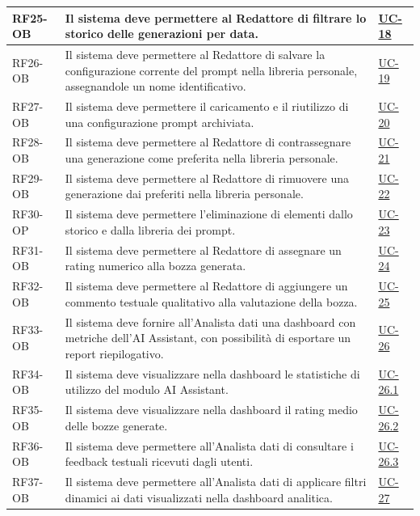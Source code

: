 ﻿\documentclass[a4paper,12pt]{article}
\begin{document}
\begin{description}[style=multiline, leftmargin=4cm, font=\bfseries]
\begin{enumerate}[leftmargin=*, nosep]
{\begin{longtable}{|p{2.5cm}|p{9.5cm}|p{3.5cm}|}
    \hline
    RF25-OB & Il sistema deve permettere al Redattore di filtrare lo storico delle generazioni per data. & \hyperref[fig:uc-18]{UC-18} \\
    \hline
    RF26-OB & Il sistema deve permettere al Redattore di salvare la configurazione corrente del prompt nella libreria personale, assegnandole un nome identificativo. & \hyperref[fig:uc-19]{UC-19} \\
    \hline
    RF27-OB & Il sistema deve permettere il caricamento e il riutilizzo di una configurazione prompt archiviata. & \hyperref[fig:uc-20]{UC-20} \\
    \hline
    RF28-OB & Il sistema deve permettere al Redattore di contrassegnare una generazione come preferita nella libreria personale. & \hyperref[fig:uc-21]{UC-21} \\
    \hline
    RF29-OB & Il sistema deve permettere al Redattore di rimuovere una generazione dai preferiti nella libreria personale. & \hyperref[fig:uc-22]{UC-22} \\
    \hline
    RF30-OP & Il sistema deve permettere l'eliminazione di elementi dallo storico e dalla libreria dei prompt. & \hyperref[fig:uc-23]{UC-23} \\
    \hline
    RF31-OB & Il sistema deve permettere al Redattore di assegnare un rating numerico alla bozza generata. & \hyperref[fig:uc-24]{UC-24} \\
    \hline
    RF32-OB & Il sistema deve permettere al Redattore di aggiungere un commento testuale qualitativo alla valutazione della bozza. & \hyperref[fig:uc-25]{UC-25} \\
    \hline
    RF33-OB & Il sistema deve fornire all'Analista dati una dashboard con metriche dell'AI Assistant, con possibilità di esportare un report riepilogativo. & \hyperref[fig:uc-26]{UC-26} \\
    \hline
    RF34-OB & Il sistema deve visualizzare nella dashboard le statistiche di utilizzo del modulo AI Assistant. & \hyperref[fig:uc-26.1]{UC-26.1} \\
    \hline
    RF35-OB & Il sistema deve visualizzare nella dashboard il rating medio delle bozze generate. & \hyperref[fig:uc-26.2]{UC-26.2} \\
    \hline
    RF36-OB & Il sistema deve permettere all'Analista dati di consultare i feedback testuali ricevuti dagli utenti. & \hyperref[fig:uc-26.3]{UC-26.3} \\
    \hline
    RF37-OB & Il sistema deve permettere all'Analista dati di applicare filtri dinamici ai dati visualizzati nella dashboard analitica. & \hyperref[fig:uc-27]{UC-27} \\

\end{longtable}}
\end{enumerate}
\end{description}
\end{document}
